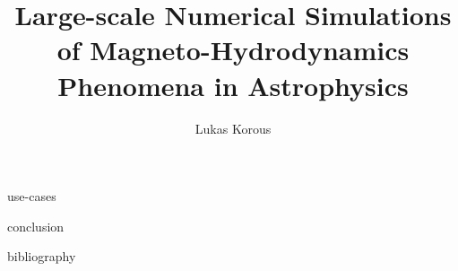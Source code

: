 \documentclass[12pt,notitlepage]{report}
\title{Large-scale Numerical Simulations of Magneto-Hydrodynamics Phenomena in Astrophysics}
\author{Lukas Korous}
\begin{document}














 {use-cases}

 {conclusion}

 {bibliography}
		
\end{document}
